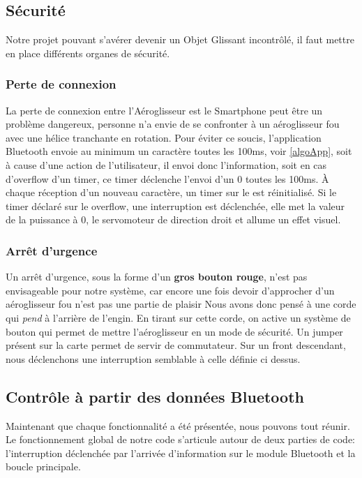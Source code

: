 			\subsection{Sécurité}\label{secu}
			Notre projet pouvant s'avérer devenir un Objet Glissant incontrôlé, il faut mettre en place différents organes de sécurité.
				\subsubsection{Perte de connexion}
				La perte de connexion entre l'Aéroglisseur est le Smartphone peut être un problème dangereux, personne n'a envie de se confronter à un aéroglisseur fou avec une hélice tranchante en rotation. Pour éviter ce soucis, l'application Bluetooth envoie au minimum un caractère toutes les 100ms, voir \ref{algoApp}, soit à cause d'une action de l'utilisateur, il envoi donc l'information, soit en cas d'overflow d'un timer, ce timer déclenche l'envoi d'un 0 toutes les 100ms. À chaque réception d'un nouveau caractère, un timer sur le \pic est réinitialisé. Si le timer déclaré sur le \pic overflow, une interruption est déclenchée, elle met la valeur de la puissance à 0, le servomoteur de direction droit et allume un effet visuel.
				
				\subsubsection{Arrêt d'urgence}
				Un arrêt d'urgence, sous la forme d'un \textbf{gros bouton rouge}, n'est pas envisageable pour notre système, car encore une fois devoir d'approcher d'un aéroglisseur fou n'est pas une partie de plaisir Nous avons donc pensé à une corde qui \textit{pend} à l'arrière de l'engin. En tirant sur cette corde, on active un système de bouton qui permet de mettre l'aéroglisseur en un mode de sécurité. Un jumper présent sur la carte permet de servir de commutateur. Sur un front descendant, nous déclenchons une interruption semblable à celle définie ci dessus.
				
				
			\subsection{Contrôle à partir des données Bluetooth}
			Maintenant que chaque fonctionnalité a été présentée, nous pouvons tout réunir. Le fonctionnement global de notre code s'articule autour de deux parties de code: l'interruption déclenchée par l'arrivée d'information sur le module Bluetooth et la boucle principale.
